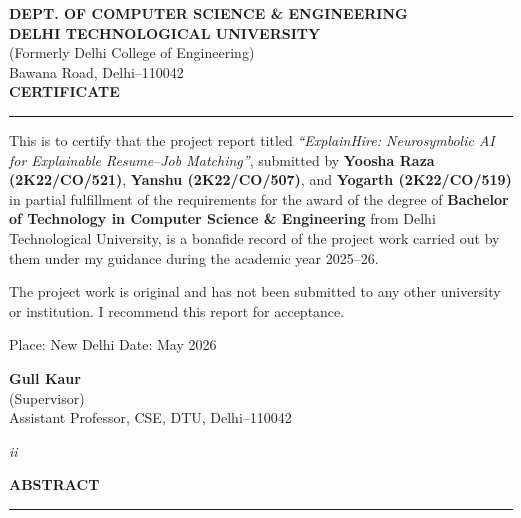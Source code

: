 \documentclass[12pt,a4paper]{report}
\begin{document}
\newpage
\thispagestyle{plain}

\begin{center}
\textbf{\large DEPT. OF COMPUTER SCIENCE \& ENGINEERING}\\
\textbf{\large DELHI TECHNOLOGICAL UNIVERSITY}\\
{\small (Formerly Delhi College of Engineering)}\\
{\small Bawana Road, Delhi--110042}\\[20pt]
\textbf{\Large CERTIFICATE}\\[4pt]
\rule{0.5\linewidth}{0.4pt}
\end{center}

\vspace{14pt}

This is to certify that the project report titled \textit{``ExplainHire: Neurosymbolic AI for Explainable Resume--Job Matching''}, submitted by \textbf{Yoosha Raza (2K22/CO/521)}, \textbf{Yanshu (2K22/CO/507)}, and \textbf{Yogarth (2K22/CO/519)} in partial fulfillment of the requirements for the award of the degree of \textbf{Bachelor of Technology in Computer Science \& Engineering} from Delhi Technological University, is a bonafide record of the project work carried out by them under my guidance during the academic year 2025--26.

The project work is original and has not been submitted to any other university or institution. I recommend this report for acceptance.

\vspace{30pt}
\noindent Place: New Delhi \hfill Date: May 2026

\vspace{36pt}
\noindent\textbf{Gull Kaur}\\
(Supervisor)\\
Assistant Professor, CSE, DTU, Delhi--110042

\vspace*{\fill}
\begin{center}{\small \textit{ii}}\end{center}

\newpage
\thispagestyle{plain}

\begin{center}
\textbf{\Large ABSTRACT}\\[4pt]
\rule{0.5\linewidth}{0.4pt}
\end{center}
\end{document}
